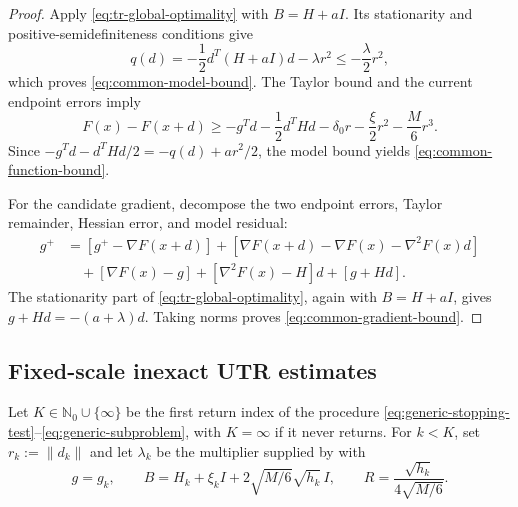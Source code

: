 \documentclass{article}
\begin{document}
\begin{proof}
Apply \eqref{eq:tr-global-optimality} with $B=H+aI$.  Its stationarity
and positive-semidefiniteness conditions give
\[
 q(d)=-\frac12d^T(H+aI)d-\lambda r^2
 \le-\frac{\lambda}{2}r^2,
\]
which proves \eqref{eq:common-model-bound}.  The Taylor bound and the
current endpoint errors imply
\[
 F(x)-F(x+d)
 \ge-g^Td-\frac12d^THd-\delta_0r-\frac{\xi}{2}r^2-\frac M6r^3.
\]
Since
$-g^Td-d^THd/2=-q(d)+ar^2/2$, the model bound yields
\eqref{eq:common-function-bound}.

For the candidate gradient, decompose the two endpoint errors, Taylor
remainder, Hessian error, and model residual:
\begin{align*}
g^+
&=[g^+-\nabla F(x+d)]
 +[\nabla F(x+d)-\nabla F(x)-\nabla^2F(x)d]\\
&\quad+[\nabla F(x)-g]
 +[\nabla^2F(x)-H]d+[g+Hd].
\end{align*}
The stationarity part of \eqref{eq:tr-global-optimality}, again with
$B=H+aI$, gives $g+Hd=-(a+\lambda)d$.  Taking norms proves
\eqref{eq:common-gradient-bound}.
\end{proof}

\subsection{Fixed-scale inexact UTR estimates}
\label{app:fixed-scale-proofs}

Let $K\in\mathbb N_0\cup\{\infty\}$ be the first return index of the
procedure \eqref{eq:generic-stopping-test}--\eqref{eq:generic-subproblem},
with $K=\infty$ if it never returns.  For $k<K$, set
$r_k:=\|d_k\|$ and let $\lambda_k$ be the multiplier supplied by
 with
\[
 g=g_k,\qquad
 B=H_k+\xi_kI+2\sqrt{M/6}\sqrt{h_k}\,I,\qquad
 R=\frac{\sqrt{h_k}}{4\sqrt{M/6}}.
\]
\end{document}
